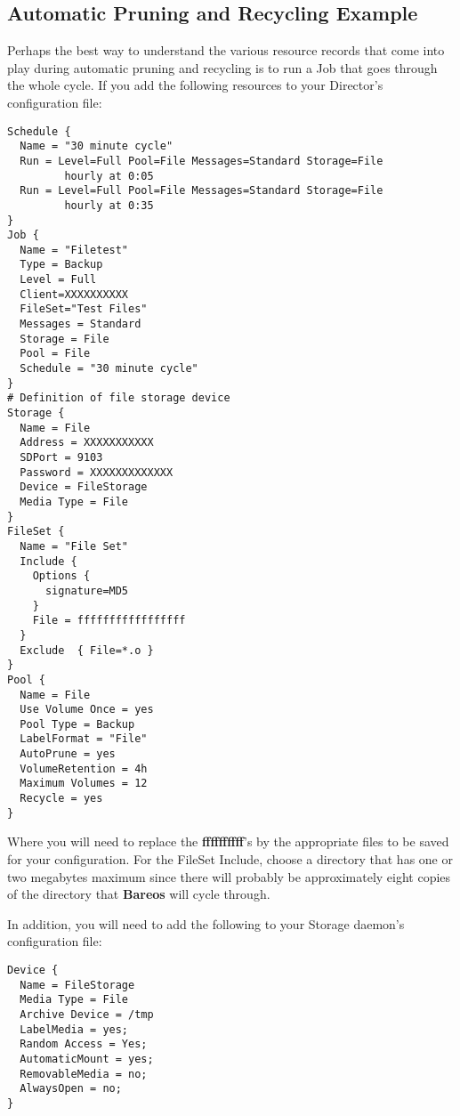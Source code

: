 \subsection{Automatic Pruning and Recycling Example}
\label{PruningExample}


Perhaps the best way to understand the various resource records that come into
play during automatic pruning and recycling is to run a Job that goes through
the whole cycle. If you add the following resources to your Director's
configuration file:

\footnotesize
\begin{verbatim}
Schedule {
  Name = "30 minute cycle"
  Run = Level=Full Pool=File Messages=Standard Storage=File
         hourly at 0:05
  Run = Level=Full Pool=File Messages=Standard Storage=File
         hourly at 0:35
}
Job {
  Name = "Filetest"
  Type = Backup
  Level = Full
  Client=XXXXXXXXXX
  FileSet="Test Files"
  Messages = Standard
  Storage = File
  Pool = File
  Schedule = "30 minute cycle"
}
# Definition of file storage device
Storage {
  Name = File
  Address = XXXXXXXXXXX
  SDPort = 9103
  Password = XXXXXXXXXXXXX
  Device = FileStorage
  Media Type = File
}
FileSet {
  Name = "File Set"
  Include {
    Options {
      signature=MD5
    }
    File = fffffffffffffffff
  }
  Exclude  { File=*.o }
}
Pool {
  Name = File
  Use Volume Once = yes
  Pool Type = Backup
  LabelFormat = "File"
  AutoPrune = yes
  VolumeRetention = 4h
  Maximum Volumes = 12
  Recycle = yes
}
\end{verbatim}
\normalsize

Where you will need to replace the {\bf ffffffffff}'s by the appropriate files
to be saved for your configuration. For the FileSet Include, choose a
directory that has one or two megabytes maximum since there will probably be
approximately eight copies of the directory that {\bf Bareos} will cycle through.

In addition, you will need to add the following to your Storage daemon's
configuration file:

\footnotesize
\begin{verbatim}
Device {
  Name = FileStorage
  Media Type = File
  Archive Device = /tmp
  LabelMedia = yes;
  Random Access = Yes;
  AutomaticMount = yes;
  RemovableMedia = no;
  AlwaysOpen = no;
}
\end{verbatim}
\normalsize

